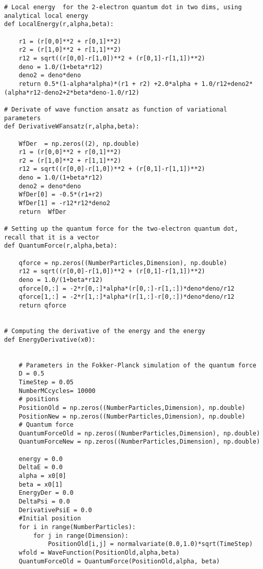\documentclass{beamer}
\begin{document}
\begin{frame}
\begin{verbatim}
# Local energy  for the 2-electron quantum dot in two dims, using analytical local energy
def LocalEnergy(r,alpha,beta):
    
    r1 = (r[0,0]**2 + r[0,1]**2)
    r2 = (r[1,0]**2 + r[1,1]**2)
    r12 = sqrt((r[0,0]-r[1,0])**2 + (r[0,1]-r[1,1])**2)
    deno = 1.0/(1+beta*r12)
    deno2 = deno*deno
    return 0.5*(1-alpha*alpha)*(r1 + r2) +2.0*alpha + 1.0/r12+deno2*(alpha*r12-deno2+2*beta*deno-1.0/r12)

# Derivate of wave function ansatz as function of variational parameters
def DerivativeWFansatz(r,alpha,beta):
    
    WfDer  = np.zeros((2), np.double)
    r1 = (r[0,0]**2 + r[0,1]**2)
    r2 = (r[1,0]**2 + r[1,1]**2)
    r12 = sqrt((r[0,0]-r[1,0])**2 + (r[0,1]-r[1,1])**2)
    deno = 1.0/(1+beta*r12)
    deno2 = deno*deno
    WfDer[0] = -0.5*(r1+r2)
    WfDer[1] = -r12*r12*deno2
    return  WfDer

# Setting up the quantum force for the two-electron quantum dot, recall that it is a vector
def QuantumForce(r,alpha,beta):

    qforce = np.zeros((NumberParticles,Dimension), np.double)
    r12 = sqrt((r[0,0]-r[1,0])**2 + (r[0,1]-r[1,1])**2)
    deno = 1.0/(1+beta*r12)
    qforce[0,:] = -2*r[0,:]*alpha*(r[0,:]-r[1,:])*deno*deno/r12
    qforce[1,:] = -2*r[1,:]*alpha*(r[1,:]-r[0,:])*deno*deno/r12
    return qforce
    

# Computing the derivative of the energy and the energy 
def EnergyDerivative(x0):

    
    # Parameters in the Fokker-Planck simulation of the quantum force
    D = 0.5
    TimeStep = 0.05
    NumberMCcycles= 10000
    # positions
    PositionOld = np.zeros((NumberParticles,Dimension), np.double)
    PositionNew = np.zeros((NumberParticles,Dimension), np.double)
    # Quantum force
    QuantumForceOld = np.zeros((NumberParticles,Dimension), np.double)
    QuantumForceNew = np.zeros((NumberParticles,Dimension), np.double)

    energy = 0.0
    DeltaE = 0.0
    alpha = x0[0]
    beta = x0[1]
    EnergyDer = 0.0
    DeltaPsi = 0.0
    DerivativePsiE = 0.0 
    #Initial position
    for i in range(NumberParticles):
        for j in range(Dimension):
            PositionOld[i,j] = normalvariate(0.0,1.0)*sqrt(TimeStep)
    wfold = WaveFunction(PositionOld,alpha,beta)
    QuantumForceOld = QuantumForce(PositionOld,alpha, beta)


\end{verbatim}
\end{frame}
\end{document}
